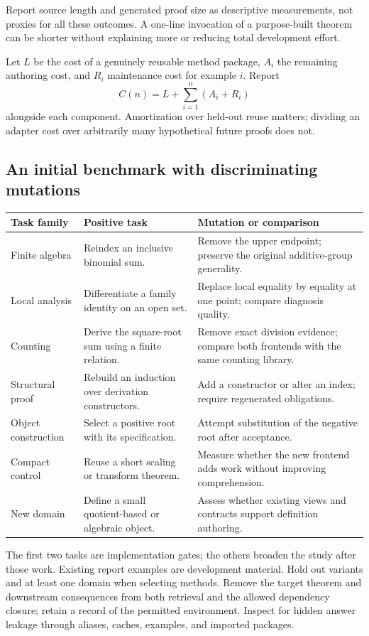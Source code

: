 \documentclass[11pt,letterpaper]{article}
\begin{document}
Report source length and generated proof size as descriptive measurements, not
proxies for all these outcomes. A one-line invocation of a purpose-built theorem
can be shorter without explaining more or reducing total development effort.

Let \(L\) be the cost of a genuinely reusable method package, \(A_i\) the remaining
authoring cost, and \(R_i\) maintenance cost for example \(i\). Report
\[
 C(n)=L+\sum_{i=1}^{n}(A_i+R_i)
\]
alongside each component. Amortization over held-out reuse matters; dividing an
adapter cost over arbitrarily many hypothetical future proofs does not.

\subsection{An initial benchmark with discriminating mutations}
\begin{longtable}{@{}P{.22\textwidth}P{.34\textwidth}P{.36\textwidth}@{}}
\toprule
Task family & Positive task & Mutation or comparison \\
\midrule
\endhead
Finite algebra & Reindex an inclusive binomial sum. & Remove the upper endpoint;
  preserve the original additive-group generality.\\
Local analysis & Differentiate a family identity on an open set. & Replace local
  equality by equality at one point; compare diagnosis quality.\\
Counting & Derive the square-root sum using a finite relation. & Remove exact
  division evidence; compare both frontends with the same counting library.\\
Structural proof & Rebuild an induction over derivation constructors. & Add a
  constructor or alter an index; require regenerated obligations.\\
Object construction & Select a positive root with its specification. & Attempt
  substitution of the negative root after acceptance.\\
Compact control & Reuse a short scaling or transform theorem. & Measure whether
  the new frontend adds work without improving comprehension.\\
New domain & Define a small quotient-based or algebraic object. & Assess whether
  existing views and contracts support definition authoring.\\
\bottomrule
\end{longtable}

The first two tasks are implementation gates; the others broaden the study after
those work. Existing report examples are development material. Hold out variants
and at least one domain when selecting methods. Remove the target theorem and
downstream consequences from both retrieval and the allowed dependency closure;
retain a record of the permitted environment. Inspect for hidden answer leakage
through aliases, caches, examples, and imported packages.
\end{document}

